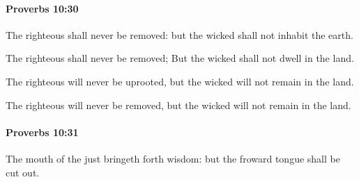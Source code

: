 		\paragraph{Proverbs 10:30} %
			\label{PROVERBS-10-30}

			The righteous shall never be removed: but the wicked shall not inhabit the earth.

			\begin{versebox}
					\item[BHS] 
					\item[ASV] The righteous shall never be removed; But the wicked shall not dwell in the land.
					\item[NIV] The righteous will never be uprooted, but the wicked will not remain in the land.
					\item[NRSV] The righteous will never be removed, but the wicked will not remain in the land.
			\end{versebox}

		\paragraph{Proverbs 10:31} %
			\label{PROVERBS-10-31}

			The mouth of the just bringeth forth wisdom: but the froward tongue shall be cut out.

